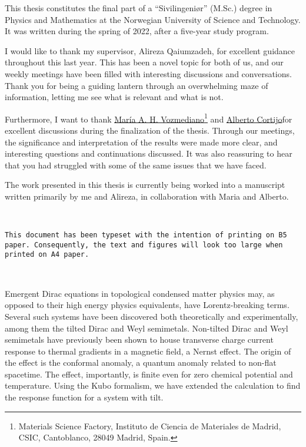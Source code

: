 This thesis constitutes the final part of a ``Sivilingeniør'' (M.Sc.) degree in Physics and Mathematics at the Norwegian University of Science and Technology.
It was written during the spring of 2022, after a five-year study program.

I would like to thank my supervisor, Alireza Qaiumzadeh, for excellent guidance throughout this last year.
This has been a novel topic for both of us, and our weekly meetings have been filled with interesting discussions and conversations.
Thank you for being a guiding lantern through an overwhelming maze of information, letting me see what is relevant and what is not.

Furthermore, I want to thank
\href{https://wp.icmm.csic.es/field-theories-in-condensed-matter-physics/vozmediano/}{María A. H. Vozmediano}\footnote{Materials Science Factory, Instituto de Ciencia de Materiales de Madrid, CSIC, Cantoblanco, 28049 Madrid, Spain\label{address-of-spain}.}
and
\href{https://wp.icmm.csic.es/field-theories-in-condensed-matter-physics/alberto-cortijo/}{Alberto Cortijo}\footnotemark[1]
for excellent discussions during the finalization of the thesis.
Through our meetings, the significance and interpretation of the results were made more clear, and interesting questions and continuations discussed.
It was also reassuring to hear that you had struggled with some of the same issues that we have faced.

The work presented in this thesis is currently being worked into a manuscript written primarily by me and Alireza, in collaboration with Maria and Alberto.


\vspace{3cm}
{
  \centering
  \hrulefill\bigskip\\
  \parbox{0.84\textwidth}{
    \centering
  \texttt{This document has been typeset with the intention of printing on B5 paper. Consequently, the text and figures will look too large when printed on A4 paper.}
  }\\
  \bigskip\smallskip\hrulefill
}

Emergent Dirac equations in topological condensed matter physics may, as opposed to their high energy physics equivalents, have Lorentz-breaking terms.
Several such systems have been discovered both theoretically and experimentally, among them the tilted Dirac and Weyl semimetals.
Non-tilted Dirac and Weyl semimetals have previously been shown to house transverse charge current response to thermal gradients in a magnetic field, a Nernst effect.
The origin of the effect is the conformal anomaly, a quantum anomaly related to non-flat spacetime.
The effect, importantly, is finite even for zero chemical potential and temperature.
Using the Kubo formalism, we have extended the calculation to find the response function for a system with tilt.

